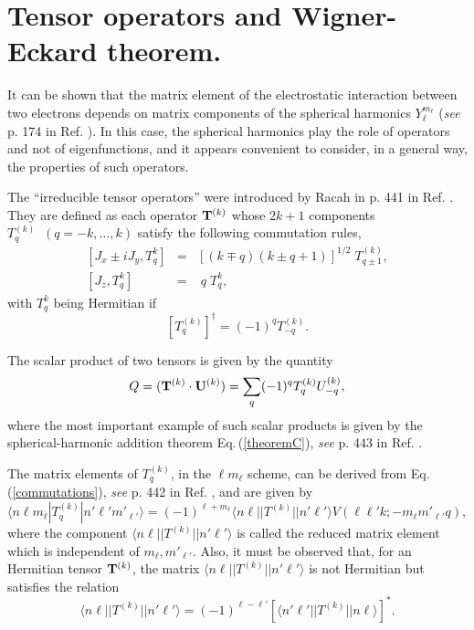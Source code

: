 \documentclass[]{interact}
\def\refe#1{{\color{blue}\textsf{Eq.}\,(\ref{#1})}}
\renewcommand{\l}{\ell}
\begin{document}
\section{Tensor operators and Wigner-Eckard theorem.}

It can be shown that the matrix element of the electrostatic interaction between two electrons depends on matrix components of the spherical harmonics $Y_\l^{m_\l}$ (\emph{see} p. 174 in Ref. \cite{Condon}). In this case, the spherical harmonics play the role of operators and not of eigenfunctions, and it appears convenient to consider, in a general way, the properties of such operators. 

The ``irreducible tensor operators'' were introduced by Racah in p. 441 in Ref. \cite{Racah}. They are defined as each operator ${\bf T}^{(k)}$ whose $2k+1$ components $T_q^{(k)}\;\;(q=-k,...,k)$ satisfy the following commutation rules,
\begin{eqnarray}
\label{commutations}
\nonumber
 \left[J_x\pm iJ_y,T_q^{k}\right]&=&\left[(k\mp q)(k\pm q+1)\right]^{1/2}\;T_{q\pm1}^{(k)},\\
 \left[J_z,T_q^{k}\right]&=&\;q\;T_q^{k},
\end{eqnarray}
with $T_q^{k}$ being Hermitian if 
\begin{equation}
 \left[T_q^{(k)}\right]^\dag=(-1)^q T_{-q}^{(k)}.
\end{equation}

The scalar product of two tensors is given by the quantity
\begin{equation}
 Q=({\bf T}^{(k)}\cdot{\bf U}^{(k)})=\sum_q (-1)^q T_q^{(k)}U_{-q}^{(k)},
\end{equation}
where the most important example of such scalar products is given by the spherical-harmonic addition theorem \refe{theoremC}, \emph{see} p. 443 in Ref. \cite{Racah}. 

The matrix elements of $T_{q}^{(k)}$, in the $\l m_\l$ scheme, can be derived from \refe{commutations}, \emph{see} p. 442 in Ref. \cite{Racah}, and are given by
\begin{equation}
\label{theoremW}
 \langle n\l m_\l|T_{q}^{(k)}|n'\l' m'_{\l'}\rangle=(-1)^{\l+m_\l}\langle n\l||T^{(k)}||n'\l'\rangle V(\l\l'k;-m_\l m'_{\l'}q),
\end{equation}
where the component $\langle n\l||T^{(k)}||n'\l'\rangle$ is called the reduced matrix element which is independent of $m_\l,m'_{\l'}$. Also, it must be observed that, for an Hermitian tensor ${\bf T}^{(k)}$, the matrix  $\langle n\l||T^{(k)}||n'\l'\rangle$ is not Hermitian but satisfies the relation
\begin{equation}
 \langle n\l||T^{(k)}||n'\l'\rangle = (-1)^{\l-\l'}\left[\langle n'\l'||T^{(k)}||n\l\rangle\right]^*.
\end{equation}
\end{document}
